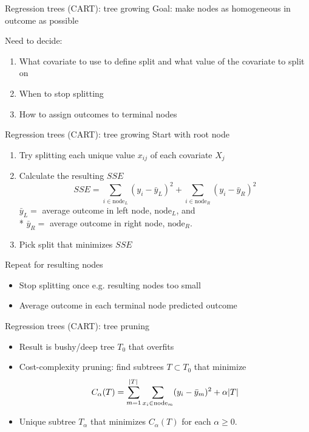 \documentclass{beamer}
\begin{document}
\begin{frame}{Regression trees (CART): tree growing}
  Goal: make nodes as homogeneous in outcome as possible
  
  \pause
  Need to decide:
  \begin{enumerate}[<+->]
    \item What covariate to use to define split and what value of the covariate to split on
    \item When to stop splitting
    \item How to assign outcomes to terminal nodes
  \end{enumerate}
\end{frame}

\begin{frame}{Regression trees (CART): tree growing}
  Start with root node
  
  \begin{enumerate}[<+(1)->]
  \item Try splitting each unique value $x_{ij}$ of each covariate $X_{j}$
  \item Calculate the resulting $SSE$
  \begin{equation*}
    SSE = \sum_{i \in \text{node}_{L}} (y_{i} - \bar{y}_{L})^2 + \sum_{i \in \text{node}_{R}} (y_{i} - \bar{y}_{R})^2
  \end{equation*}
  $\bar{y}_{L} = $ average outcome in left node, $\text{node}_{L}$, and \\*   $\bar{y}_{R} = $ average outcome in right node, $\text{node}_{R}$.
  \item Pick split that minimizes $SSE$
    \end{enumerate}
  \pause
  Repeat for resulting nodes 
    
  \begin{itemize}[<+(1)->]
  \item Stop splitting once e.g. resulting nodes too small
  \item Average outcome in each terminal node predicted outcome 
  \end{itemize}
\end{frame}

\begin{frame}[c]{Regression trees (CART): tree pruning}
  \begin{itemize}[<+->]
    \item Result is bushy/deep tree $T_{0}$ that overfits
    \item Cost-complexity pruning: find subtrees $T \subset T_{0}$ that minimize
    \begin{equation*}
        C_{\alpha}(T) = \sum_{m = 1}^{\abs{T}} \sum_{x_{i} \in \text{node}_{m}} (y_{i} - \bar{y}_{m})^2 + \alpha \abs{T}
    \end{equation*}
    \item Unique subtree $T_{\alpha}$ that minimizes $C_{\alpha}(T)$ for each $\alpha \geq 0$.
  \end{itemize}
\end{frame}
\end{document}
